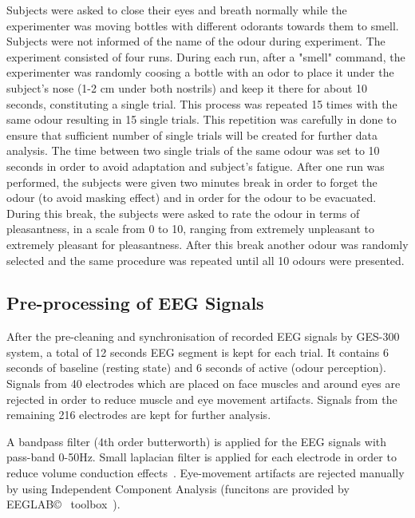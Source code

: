 Subjects were asked to close their eyes and breath normally while the experimenter was moving bottles with different odorants towards them to smell. Subjects were not informed of the name of the odour during experiment. The experiment consisted of four runs. During each run, after a "smell" command, the experimenter was randomly coosing a bottle with an odor to place it under the subject's nose (1-2 cm under both nostrils) and keep it there for about 10 seconds, constituting a single trial. This process was repeated 15 times with the same odour resulting in 15 single trials. This repetition was carefully in done to ensure that sufficient number of single trials will be created for further data analysis. The time between two single trials of the same odour was set to 10 seconds in order to avoid adaptation and subject's fatigue. After one run was performed, the subjects were given two minutes break in order to forget the odour (to avoid masking effect) and in order for the odour to be evacuated. During this break, the subjects were asked to rate the odour in terms of pleasantness, in a scale from 0 to 10, ranging from extremely unpleasant to extremely pleasant for pleasantness. After this break another odour was randomly selected and the same procedure was repeated until all 10 odours were presented.    

\subsection{Pre-processing of EEG Signals}
After the pre-cleaning and synchronisation of recorded EEG signals by GES-300 system, a total of 12 seconds EEG segment is kept for each trial. It contains 6 seconds of baseline (resting state) and 6 seconds of active (odour perception). Signals from 40 electrodes which are placed on face muscles and around eyes are rejected in order to reduce muscle and eye movement artifacts. Signals from the remaining 216 electrodes are kept for further analysis. 

A bandpass filter (4th order butterworth) is applied for the EEG signals with pass-band 0-50Hz. Small laplacian filter is applied for each electrode in order to reduce volume conduction effects~\cite{wolters2007volume}. Eye-movement artifacts are rejected manually by using Independent Component Analysis (funcitons are provided by EEGLAB\copyright~ toolbox~\cite{luck2014introduction}). 

